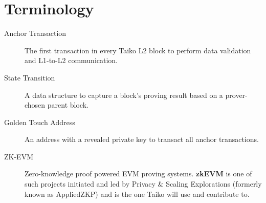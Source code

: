 \section{Terminology} \label{ch:Terminology}

\begin{description}
\item[Anchor Transaction] The first transaction in every Taiko L2 block to perform data validation and L1-to-L2 communication.


\item[State Transition] A data structure to capture a block's proving result based on a prover-chosen parent block.

\item[Golden Touch Address] An address with a revealed private key to transact all anchor transactions.

\item[ZK-EVM] Zero-knowledge proof powered EVM proving systems. \textbf{zkEVM} is one of such projects initiated and led by 
Privacy \& Scaling Explorations (formerly known as AppliedZKP)\cite{pse} and is the one Taiko will use and contribute to.
\end{description}

